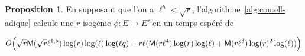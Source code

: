\documentclass[10pt,a4paper]{book}
\theoremstyle{plain}
\theoremstyle{definition}
\theoremstyle{definition}
\theoremstyle{definition}
\theoremstyle{definition}
\newtheorem{prop}[thm]{Proposition}
\theoremstyle{definition}
\theoremstyle{remark}
\theoremstyle{remark}
\theoremstyle{definition}
\begin{document}
\begin{prop}
  \label{pro:full-complexity}
  En supposant que l'on a $\ell^h<\sqrt{r}$, 
  l'algorithme~\ref{alg:cou:ell-adique} calcule une $r$-isogénie 
  ${\phi:E \rightarrow E'}$ en un temps espéré de 
 
 \[
O\Bigl(\sqrt{r}\mathsf{M}(\sqrt{r}\ell^{1,5})\log(r)\log(\ell)\log(\ell q) + r \ell ( \mathsf{M}(r \ell^4) \log(r) \log(\ell) + \mathsf{M}(r \ell^3) \log(r)^2 \log(\ell) )  \Bigr)
 \]
\end{prop}
\end{document}
